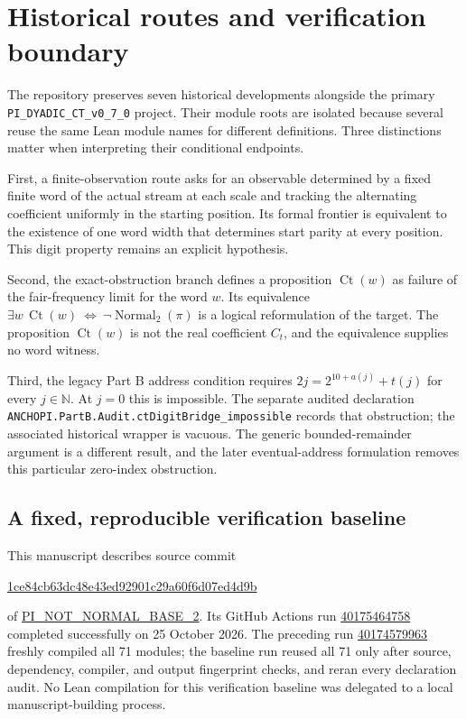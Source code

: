 \documentclass[11pt,a4paper]{article}
\theoremstyle{definition}
\theoremstyle{remark}
\newcommand{\N}{\mathbb N}
\newcommand{\Normal}{\operatorname{Normal}_2}
\newcommand{\repo}{\href{https://github.com/randogelist/PI_NOT_NORMAL_BASE_2}{PI\_NOT\_NORMAL\_BASE\_2}}
\newcommand{\code}[1]{{\small\nolinkurl{#1}}}
\begin{document}
\section{Historical routes and verification boundary}
\label{sec:verification}

The repository preserves seven historical developments alongside the
primary \code{PI_DYADIC_CT_v0_7_0} project.
Their module roots are isolated because several reuse the same Lean
module names for different definitions. Three distinctions matter
when interpreting their conditional endpoints.

First, a finite-observation route asks for an observable determined by
a fixed finite word of the actual stream at each scale and tracking
the alternating coefficient uniformly in the starting position.
Its formal frontier is equivalent to the existence of one word width
that determines start parity at every position. This digit property
remains an explicit hypothesis.

Second, the exact-obstruction branch defines a proposition
$\operatorname{Ct}(w)$ as failure of the fair-frequency limit for
the word $w$. Its equivalence
$\exists w\,\operatorname{Ct}(w)\ \Longleftrightarrow\ \neg\Normal(\pi)$
is a logical reformulation of the target.
The proposition $\operatorname{Ct}(w)$ is not the real coefficient
$C_t$, and the equivalence supplies no word witness.

Third, the legacy Part B address condition requires
$2j=2^{10+a(j)}+t(j)$ for every $j\in\N$.
At $j=0$ this is impossible. The separate audited declaration
\code{ANCHOPI.PartB.Audit.ctDigitBridge_impossible} records that
obstruction; the associated historical wrapper is vacuous.
The generic bounded-remainder argument is a different result,
and the later eventual-address formulation removes this particular
zero-index obstruction.

\subsection{A fixed, reproducible verification baseline}

This manuscript describes source commit
\begin{center}\small\url{1ce84cb63dc48e43ed92901c29a60f6d07ed4d9b}\end{center}
of \repo. Its GitHub Actions run
\href{https://github.com/randogelist/PI_NOT_NORMAL_BASE_2/actions/runs/40175464758}{40175464758}
completed successfully on 25 October 2026.
The preceding run
\href{https://github.com/randogelist/PI_NOT_NORMAL_BASE_2/actions/runs/40174579963}{40174579963}
freshly compiled all 71 modules; the baseline run reused all 71 only
after source, dependency, compiler, and output fingerprint checks,
and reran every declaration audit.
No Lean compilation for this verification baseline was delegated to
a local manuscript-building process.
\end{document}
